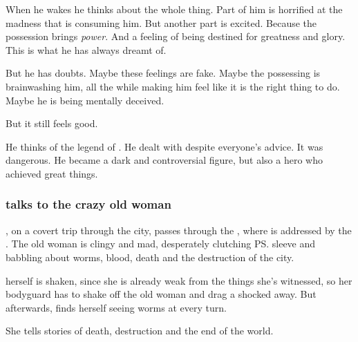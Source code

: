 \begin{garbage}
When he wakes he thinks about the whole thing. 
Part of him is horrified at the madness that is consuming him. 
But another part is excited. 
Because the possession brings \emph{power}. 
And a feeling of being destined for greatness and glory. 
This is what he has always dreamt of. 

But he has doubts. 
Maybe these feelings are fake. 
Maybe the possessing \Archon{} is brainwashing him, all the while making him feel like it is the right thing to do. 
Maybe he is being mentally deceived. 

But it still feels good. 

He thinks of the legend of . 
He dealt with \qliphoth{} despite everyone's advice. 
It was dangerous. 
He became a dark and controversial figure, but also a hero who achieved great things. 





\subsubsection{\Tiroco{} talks to the crazy old woman}
\Tiroco, on a covert trip through the city, passes through the , where is addressed by the . The old woman is clingy and mad, desperately clutching \ps{\Tiroco} sleeve and babbling about worms, blood, death and the destruction of the city. 

\Tiroco{} herself is shaken, since she is already weak from the things she's witnessed, so her bodyguard has to shake off the old woman and drag a shocked \Tiroco{} away. But afterwards, \Tiroco{} finds herself seeing worms at every turn.


She tells stories of death, destruction and the end of the world.


\end{garbage}
